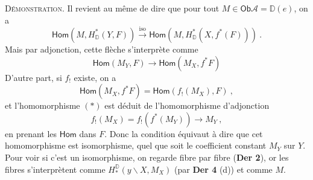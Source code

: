 \documentclass[11pt,leqno]{article}
\newcommand{\DD}{\mathbb{D}}
\newcommand{\cA}{\mathcal{A}}
\newcommand{\Ob}{\mathsf{Ob}}
\newcommand{\sHom}{\mathsf{Hom}}
\begin{document}
\noindent\textsc{Démonstration}. Il revient au même de dire que pour tout $M \in \Ob \cA = \DD(e)$, on a
\[
\sHom(M, H^*_{\DD}(Y, F)) \overset{\mathrm{iso}}{\longrightarrow} \sHom(M, H^*_{\DD}(X, f^*(F))) \ .
\]
Mais par adjonction, cette flèche s'interprète comme
\[
\sHom(M_Y, F) \longrightarrow \sHom(M_X, f^*F) \tag*{$(*)$}
\]
D'autre part, si $f_!$ existe, on a
\[
\sHom(M_X, f^*F) = \sHom(f_!(M_X), F) \ ,
\]
et l'homomorphisme $(*)$ est déduit de l'homomorphisme d'adjonction
\[
f_!(M_X) = f_!(f^*(M_Y)) \longrightarrow M_Y \ , \tag*{$(**)$}
\]
en prenant les $\sHom$ dans $F$. Donc la condition équivaut à dire que cet homomorphisme est isomorphisme, quel que soit le coefficient constant $M_Y$ sur $Y$. Pour voir si c'est un isomorphisme, on regarde fibre par fibre (\textbf{Der 2}), or les fibres s'interprètent comme $H^{\DD}_*(y\backslash X, M_X)$ (par \textbf{Der 4} (d)) et comme $M$.
\end{document}
